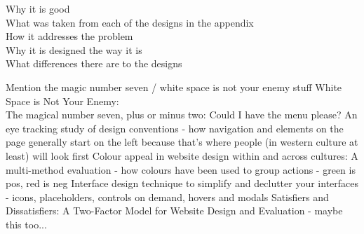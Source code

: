 {\color{red}
\noindent 
Why it is good\ \\
What was taken from each of the designs in the appendix\ \\
How it addresses the problem \ \\
Why it is designed the way it is\ \\
What differences there are to the designs
}

 
{\color{red}
Mention the magic number seven / white space is not your enemy stuff
White Space is Not Your Enemy: \cite{golombisky2013white}\ \\
The magical number seven, plus or minus two: \cite{miller1956magical}
Could I have the menu please? An eye tracking study of design conventions \cite{mccarthy2004could} - how navigation and elements on the page generally start on the left because that's where people (in western culture at least) will look first
Colour appeal in website design within and across cultures: A multi-method evaluation  \cite{cyr2010colour} - how colours have been used to group actions - green is pos, red is neg
Interface design technique to simplify and declutter your interfaces \cite{depot2014clutter} - icons, placeholders, controls on demand, hovers and modals
Satisfiers and Dissatisfiers: A Two-Factor Model for Website Design and Evaluation \cite{zhang2000satisfiers} - maybe this too...
}

